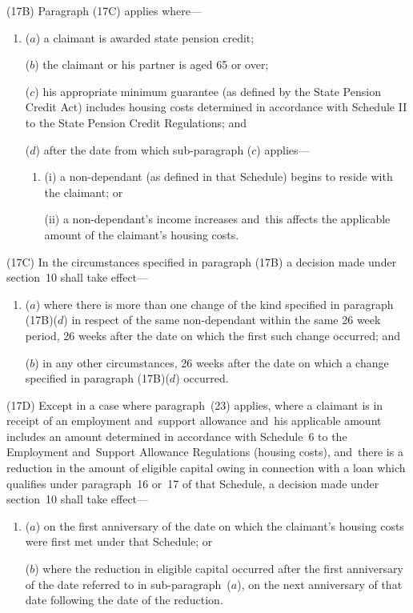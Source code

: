 \documentclass[12pt,a4paper]{article}
\begin{document}
(17B) Paragraph (17C) applies where—
\begin{enumerate}\item[]
($a$) a claimant is awarded state pension credit;

($b$) the claimant or his partner is aged 65 or over;

($c$) his appropriate minimum guarantee (as defined by the State Pension Credit Act) includes housing costs determined in accordance with Schedule II to the State Pension Credit Regulations; and

($d$) after the date from which sub-paragraph ($c$)  applies—
\begin{enumerate}\item[]
(i) a non-dependant (as defined in that Schedule) begins to reside with the claimant; or

(ii) a non-dependant’s income increases and~this affects the applicable amount of the claimant’s housing costs.
\end{enumerate}
\end{enumerate}

(17C) In the circumstances specified in paragraph (17B) a decision made under section~10 shall take effect—
\begin{enumerate}\item[]
($a$) where there is more than one change of the kind specified in paragraph (17B)($d$)  in respect of the same non-dependant within the same 26 week period, 26 weeks after the date on which the first such change occurred; and

($b$) in any other circumstances, 26 weeks after the date on which a change specified in paragraph (17B)($d$)  occurred.
\end{enumerate}

(17D) Except in a case where paragraph~(23) applies, where a claimant is in receipt of an employment and~support allowance and~his applicable amount includes an amount determined in accordance with Schedule~6 to the Employment and~Support Allowance Regulations (housing costs), and~there is a reduction in the amount of eligible capital owing in connection with a loan which qualifies under paragraph~16 or~17 of that Schedule, a decision made under section~10 shall take effect—
\begin{enumerate}\item[]
($a$) on the first anniversary of the date on which the claimant’s housing costs were first met under that Schedule; or

($b$) where the reduction in eligible capital occurred after the first anniversary of the date referred to in sub-paragraph~($a$), on the next anniversary of that date following the date of the reduction.
\end{enumerate}
\end{document}
